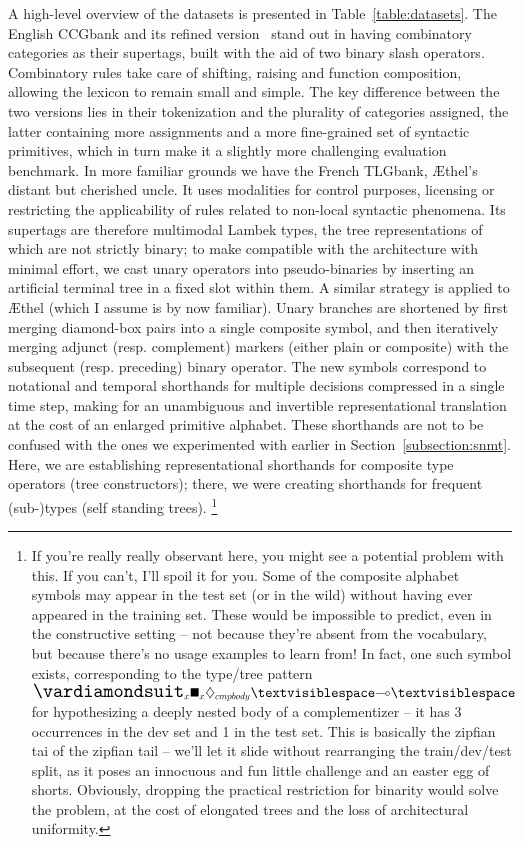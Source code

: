 A high-level overview of the datasets is presented in Table~\ref{table:datasets}.
The English CCGbank and its refined version~\cite[rebank]{honnibal2010rebanking} stand out in having combinatory categories as their supertags, built with the aid of two binary slash operators.
Combinatory rules take care of shifting, raising and function composition, allowing the lexicon to remain small and simple.
The key difference between the two versions lies in their tokenization and the plurality of categories assigned, the latter containing more assignments and a more fine-grained set of syntactic primitives, which in turn make it a slightly more challenging evaluation benchmark.
In more familiar grounds we have the French TLGbank, \AE thel's distant but cherished uncle. 
It uses modalities for control purposes, licensing or restricting the applicability of rules related to non-local syntactic phenomena.
Its supertags are therefore multimodal Lambek types, the tree representations of which are not strictly binary; to make compatible with the architecture with minimal effort, we cast unary operators into pseudo-binaries by inserting an artificial terminal tree in a fixed slot within them.
A similar strategy is applied to \AE thel (which I assume is by now familiar).
Unary branches are shortened by first merging diamond-box pairs into a single composite symbol, and then iteratively merging adjunct (resp. complement) markers (either plain or composite) with the subsequent (resp. preceding) binary operator.
The new symbols correspond to notational and temporal shorthands for multiple decisions compressed in a single time step, making for an unambiguous and invertible representational translation at the cost of an enlarged primitive alphabet.
These shorthands are not to be confused with the ones we experimented with earlier in Section~\ref{subsection:snmt}.
Here, we are establishing representational shorthands for composite type operators (tree constructors); there, we were creating shorthands for frequent (sub-)types (self standing trees).%
	\footnote{If you're really really observant here, you might see a potential problem with this. 
	If you can't, I'll spoil it for you.
	Some of the composite alphabet symbols may appear in the test set (or in the wild) without having ever appeared in the training set.
	These would be impossible to predict, even in the constructive setting -- not because they're absent from the vocabulary, but because there's no usage examples to learn from!
	In fact, one such symbol exists, corresponding to the type/tree pattern $\dxdia{x}\dxbox{x}\ddia{cmpbody} \textvisiblespace \li \textvisiblespace$ for hypothesizing a deeply nested body of a complementizer -- it has 3 occurrences in the dev set and 1 in the test set.
	This is basically the zipfian tai of the zipfian tail -- we'll let it slide without rearranging the train/dev/test split, as it poses an innocuous and fun little challenge and an easter egg of shorts.
	Obviously, dropping the practical restriction for binarity would solve the problem, at the cost of elongated trees and the loss of architectural uniformity.}
	
